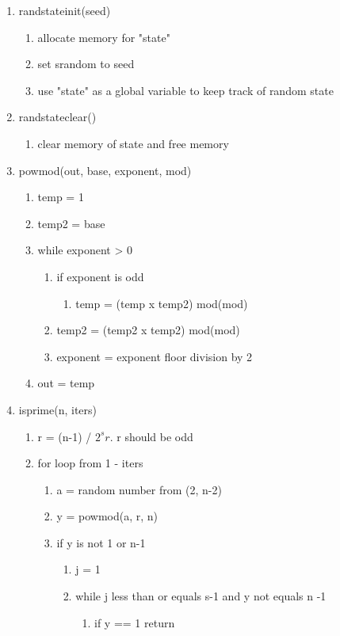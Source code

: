 \documentclass[11pt]{article}
\begin{document}
\begin{enumerate}
\item randstateinit(seed)
	\begin{enumerate}
	\item allocate memory for "state" 
	\item set srandom to seed
	\item use "state" as a global variable to keep track of random state
	\end{enumerate}
\item randstateclear()
	\begin{enumerate}
	\item clear memory of state and free memory
	\end{enumerate}
\item powmod(out, base, exponent, mod)
	\begin{enumerate}
	\item temp = 1
	\item temp2 = base
	\item while exponent > 0
		\begin{enumerate}
		\item if exponent is odd
			\begin{enumerate}
			\item temp = (temp x temp2) mod(mod)
			\end{enumerate}
		\item temp2 = (temp2 x temp2) mod(mod)
		\item exponent = exponent floor division by 2
		\end{enumerate}
	\item out = temp
	\end{enumerate}
\item isprime(n, iters)
	\begin{enumerate}
	\item r = (n-1) / \(2^s r\). r should be odd
	\item for loop from 1 - iters
		\begin{enumerate}
		\item a = random number from (2, n-2)
		\item y = powmod(a, r, n)
		\item if y is not 1 or n-1
			\begin{enumerate}
			\item j = 1
			\item while j less than or equals s-1 and  y not equals n -1
				\begin{enumerate}
				\item if y == 1 return

\end{enumerate}
\end{enumerate}
\end{enumerate}
\end{enumerate}
\end{enumerate}
\end{document}
